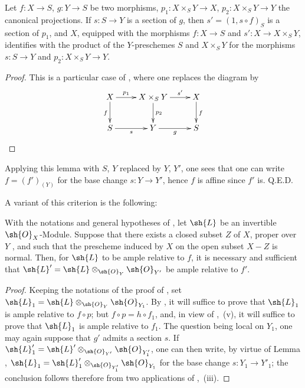 \begin{lemma}[14.5.11.1]
\label{IV.14.5.11.1}
Let $f:X\to S$, $g:Y\to S$ be two morphisms, $p_1:X\times_S Y\to X$, $p_2:X\times_S Y\to Y$ the canonical projections.
If $s:S\to Y$ is a section of $g$, then $s'=(1,s\circ f)_S$ is a section of $p_1$, and $X$, equipped with the morphisms $f:X\to S$ and $s':X\to X\times_S Y$, identifies with the product of the $Y$-preschemes $S$ and $X\times_S Y$ for the morphisms $s:S\to Y$ and $p_2:X\times_S Y\to Y$.
\end{lemma}

\begin{proof}
This is a particular case of , where one replaces the diagram by
\[
\xymatrix{
  X \ar[r]^-{p_1} \ar[d]_f & X\times_S Y \ar[r]^-{s'} \ar[d]^{p_2} & X \ar[d]^f \\
  S \ar[r]_-{s} & Y \ar[r]_-{g} & S
}
\]
\end{proof}

Applying this lemma with $S$, $Y$ replaced by $Y$, $Y'$, one sees that one can write $f=(f')_{(Y)}$ for the base change $s:Y\to Y'$, hence $f$ is affine since $f'$ is.
Q.E.D.

A variant of this criterion is the following:

\begin{corollary}[14.5.12]
\label{IV.14.5.12}
With the notations and general hypotheses of , let $\sh{L}$ be an invertible $\sh{O}_X$-Module.
Suppose that there exists a closed subset $Z$ of $X$, proper over $Y$ , and such that the prescheme induced by $X$ on the open subset $X-Z$ is normal.
Then, for $\sh{L}$ to be ample relative to $f$, it is necessary and sufficient that $\sh{L}'=\sh{L}\otimes_{\sh{O}_Y}\sh{O}_{Y'}$ be ample relative to $f'$.
\end{corollary}

\begin{proof}
Keeping the notations of the proof of , set $\sh{L}_1=\sh{L}\otimes_{\sh{O}_Y}\sh{O}_{Y_1}$.
By , it will suffice to prove that $\sh{L}_1$ is ample relative to $f\circ p$; but $f\circ p=h\circ f_1$, and, in view of ,~(v), it will suffice to prove that $\sh{L}_1$ is ample relative to $f_1$.
The question being local on $Y_1$, one may again suppose that $g'$ admits a section $s$.
If $\sh{L}'_1=\sh{L}'\otimes_{\sh{O}_{Y'}}\sh{O}_{Y'_1}$, one can then write, by virtue of Lemma , $\sh{L}_1=\sh{L}'_1\otimes_{\sh{O}_{Y'_1}}\sh{O}_{Y_1}$ for the base change $s:Y_1\to Y'_1$; the conclusion follows therefore from two applications of ,~(iii).
\end{proof}
